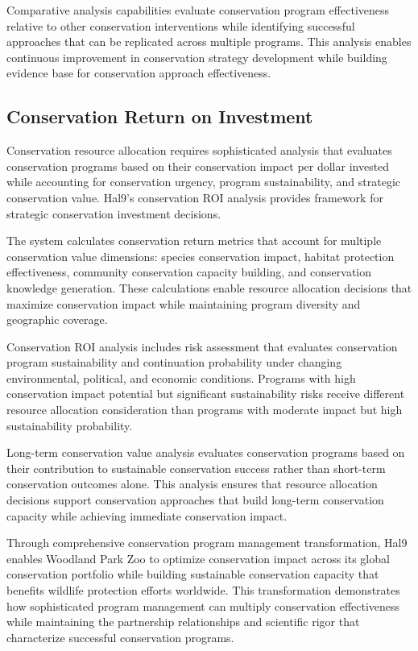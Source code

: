 \documentclass[
  Letterpaper,
]{scrbook}
\begin{document}
Comparative analysis capabilities evaluate conservation program
effectiveness relative to other conservation interventions while
identifying successful approaches that can be replicated across multiple
programs. This analysis enables continuous improvement in conservation
strategy development while building evidence base for conservation
approach effectiveness.

\subsection{Conservation Return on
Investment}\label{conservation-return-on-investment}

Conservation resource allocation requires sophisticated analysis that
evaluates conservation programs based on their conservation impact per
dollar invested while accounting for conservation urgency, program
sustainability, and strategic conservation value. Hal9's conservation
ROI analysis provides framework for strategic conservation investment
decisions.

The system calculates conservation return metrics that account for
multiple conservation value dimensions: species conservation impact,
habitat protection effectiveness, community conservation capacity
building, and conservation knowledge generation. These calculations
enable resource allocation decisions that maximize conservation impact
while maintaining program diversity and geographic coverage.

Conservation ROI analysis includes risk assessment that evaluates
conservation program sustainability and continuation probability under
changing environmental, political, and economic conditions. Programs
with high conservation impact potential but significant sustainability
risks receive different resource allocation consideration than programs
with moderate impact but high sustainability probability.

Long-term conservation value analysis evaluates conservation programs
based on their contribution to sustainable conservation success rather
than short-term conservation outcomes alone. This analysis ensures that
resource allocation decisions support conservation approaches that build
long-term conservation capacity while achieving immediate conservation
impact.

Through comprehensive conservation program management transformation,
Hal9 enables Woodland Park Zoo to optimize conservation impact across
its global conservation portfolio while building sustainable
conservation capacity that benefits wildlife protection efforts
worldwide. This transformation demonstrates how sophisticated program
management can multiply conservation effectiveness while maintaining the
partnership relationships and scientific rigor that characterize
successful conservation programs.
\end{document}
